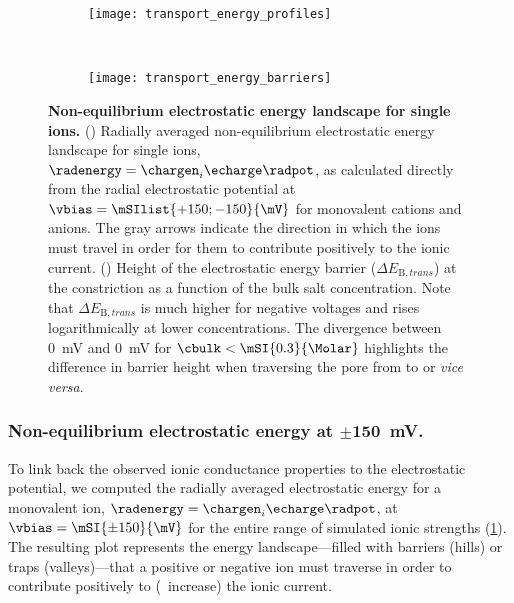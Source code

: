 %
\begin{figure}[p]
  \centering
  
  \begin{subfigure}[t]{11cm}
    \centering
    \caption{}\vspace{-5mm}\label{fig:transport_energy_profiles}
    \texttt{[image: transport\_energy\_profiles]}
  \end{subfigure}
  \\
  \begin{subfigure}[t]{9cm}
    \centering
    \caption{}\vspace{-3mm}\label{fig:transport_energy_barriers}
    \texttt{[image: transport\_energy\_barriers]}
  \end{subfigure}

  \caption[Non-equilibrium electrostatic energy landscape for single ions]%
  {%
    \textbf{Non-equilibrium electrostatic energy landscape for single ions.}
    ()
    Radially averaged non-equilibrium electrostatic energy landscape for single ions, $\radenergy =
    \chargen_{i} \echarge \radpot$, as calculated directly from the radial electrostatic potential at $\vbias
    = \mSIlist{+150;-150}{\mV}$ for monovalent cations and anions. The gray arrows indicate the direction in
    which the ions must travel in order for them to contribute positively to the ionic current.
    ()
    Height of the electrostatic energy barrier ($\Delta E_{\text{B},\mathit{trans}}$) at the \transi{}
    constriction as a function of the bulk salt concentration. Note that $\Delta E_{\text{B},\mathit{trans}}$
    is much higher for negative voltages and rises logarithmically at lower concentrations. The divergence
    between \SI[explicit-sign=+]{0}{\mV} and \SI[explicit-sign=-]{0}{\mV} for $\cbulk < \mSI{0.3}{\Molar}$
    highlights the difference in barrier height when traversing the pore from \cisi{} to \transi{} or
    \textit{vice versa}.
  }\label{fig:transport_energy}
\end{figure}
%

\subsubsection{Non-equilibrium electrostatic energy at $\mathbf{\pm150}$~mV.}
%

To link back the observed ionic conductance properties to the electrostatic potential, we computed the
radially averaged electrostatic energy for a monovalent ion, $\radenergy = \chargen_{i} \echarge \radpot$, at
$\vbias = \mSI{\pm150}{\mV}$ for the entire range of simulated ionic strengths
(\cref{fig:transport_energy_profiles}). The resulting plot represents the energy landscape---filled with
barriers (hills) or traps (valleys)---that a positive or negative ion must traverse in order to contribute
positively to (\ie~increase) the ionic current.

